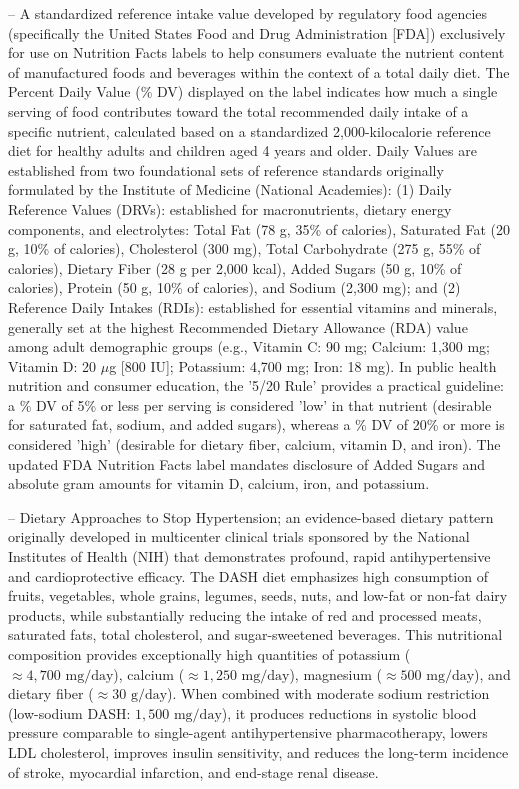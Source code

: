 -- A standardized reference intake value developed by regulatory food agencies (specifically the United States Food and Drug Administration [FDA]) exclusively for use on Nutrition Facts labels to help consumers evaluate the nutrient content of manufactured foods and beverages within the context of a total daily diet. The Percent Daily Value (\% DV) displayed on the label indicates how much a single serving of food contributes toward the total recommended daily intake of a specific nutrient, calculated based on a standardized 2,000-kilocalorie reference diet for healthy adults and children aged 4 years and older. Daily Values are established from two foundational sets of reference standards originally formulated by the Institute of Medicine (National Academies): (1) Daily Reference Values (DRVs): established for macronutrients, dietary energy components, and electrolytes: Total Fat (78 g, 35\% of calories), Saturated Fat (20 g, 10\% of calories), Cholesterol (300 mg), Total Carbohydrate (275 g, 55\% of calories), Dietary Fiber (28 g per 2,000 kcal), Added Sugars (50 g, 10\% of calories), Protein (50 g, 10\% of calories), and Sodium (2,300 mg); and (2) Reference Daily Intakes (RDIs): established for essential vitamins and minerals, generally set at the highest Recommended Dietary Allowance (RDA) value among adult demographic groups (e.g., Vitamin C: 90 mg; Calcium: 1,300 mg; Vitamin D: 20 $\mu$g [800 IU]; Potassium: 4,700 mg; Iron: 18 mg). In public health nutrition and consumer education, the '5/20 Rule' provides a practical guideline: a \% DV of 5\% or less per serving is considered 'low' in that nutrient (desirable for saturated fat, sodium, and added sugars), whereas a \% DV of 20\% or more is considered 'high' (desirable for dietary fiber, calcium, vitamin D, and iron). The updated FDA Nutrition Facts label mandates disclosure of Added Sugars and absolute gram amounts for vitamin D, calcium, iron, and potassium.

-- Dietary Approaches to Stop Hypertension; an evidence-based dietary pattern originally developed in multicenter clinical trials sponsored by the National Institutes of Health (NIH) that demonstrates profound, rapid antihypertensive and cardioprotective efficacy. The DASH diet emphasizes high consumption of fruits, vegetables, whole grains, legumes, seeds, nuts, and low-fat or non-fat dairy products, while substantially reducing the intake of red and processed meats, saturated fats, total cholesterol, and sugar-sweetened beverages. This nutritional composition provides exceptionally high quantities of potassium ($\approx 4{,}700\text{ mg/day}$), calcium ($\approx 1{,}250\text{ mg/day}$), magnesium ($\approx 500\text{ mg/day}$), and dietary fiber ($\approx 30\text{ g/day}$). When combined with moderate sodium restriction (low-sodium DASH: $1{,}500\text{ mg/day}$), it produces reductions in systolic blood pressure comparable to single-agent antihypertensive pharmacotherapy, lowers LDL cholesterol, improves insulin sensitivity, and reduces the long-term incidence of stroke, myocardial infarction, and end-stage renal disease.

